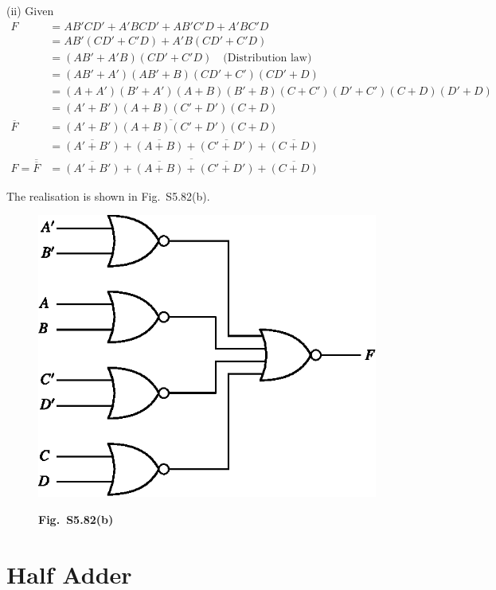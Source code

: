 \begin{solution}
\item[(ii)] Given
\begin{align*}
F &= AB'CD'+A'BCD'+AB'C'D+A'BC'D\\[6pt]
  &= AB'(CD'+C'D)+A'B(CD'+C'D)\\[6pt]
  &= (AB'+A'B)(CD'+C'D)\quad \text{(Distribution law)}\\[6pt]
  &= (AB'+A')(AB'+B)(CD'+C')(CD'+D)\\[6pt]
  &= (A+A')(B'+A')(A+B)(B'+B)(C+C')(D'+C')(C+D)(D'+D)\\[6pt]
  &= (A'+B')(A+B)(C'+D')(C+D)\\[6pt]
\overline{F}  &= \overline{(A'+B')(A+B)(C'+D')(C+D)}\\[6pt]
 &= \overline{(A'+B')}+\overline{(A+B)}+\overline{(C'+D')}+\overline{(C+D)}\\[6pt]
F=\overline{\overline{F}} &= \overline{\overline{(A'+B')}+\overline{(A+B)}+\overline{(C'+D')}+\overline{(C+D)}} 
\end{align*}

\eject

The realisation is shown in Fig.~S5.82(b).
\begin{figure}[H]
\centering
\includegraphics[scale=1.1]{chap5/figS14.eps}

\smallskip
{\bf Fig.~S5.82(b)}
\end{figure}
\end{solution}

\section{Half Adder}\label{sec5.16}

